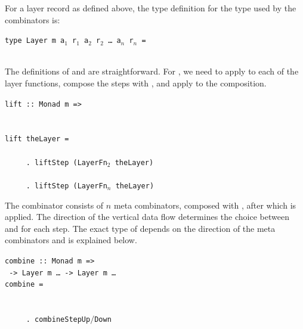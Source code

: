 \documentclass{llncs}
\begin{document}

For a layer record as defined above, the type definition for the  type used by the combinators is:

\begin{small}
\begin{tabbing}
{\tt ty}\={\tt pe Layer m a$_1$ r$_1$ a$_2$ r$_2$ \dots ~a$_n$ r$_n$ =}\\
        \\
\end{tabbing}
\end{small}



The definitions of  and  are straightforward. For , we need to apply  to each of the layer functions, compose the steps with , and apply  to the composition. 

\begin{small}
\begin{tabbing}
{\tt lift}\verb| :: |\={\tt Monad m =>}\\
                     \\
                     \\
{\tt li}\={\tt ft t}\={\tt heLayer = }\\
\\
\>\verb|     . lift|{\tt Step (LayerFn$_2$ theLayer)}\\
\>{\tt ~~~~~\dots}\\ 
\>\verb|     . lift|{\tt Step (LayerFn$_n$ theLayer)}
\end{tabbing}
\end{small}%


The  combinator consists of $n$  meta combinators, composed with , after which  is applied. The direction of the vertical data flow determines the choice between  and  for each step.  The exact type of  depends on the direction of the meta combinators and is explained below. 

\begin{small}
\begin{tabbing}
{\tt combine}\verb| :: |\={\tt Monad m =>}\\
                        \verb| -> |{\tt Layer m \dots}\verb| -> |{\tt Layer m \dots }\\
{\tt co}\={\tt mbine}\={\tt ~= }\\
\\
\>{\tt ~~~~~\dots}\\ 
\>\verb|     . combine|{\tt StepUp$/$Down}\\
\end{tabbing}%
\end{small}
\end{document}
